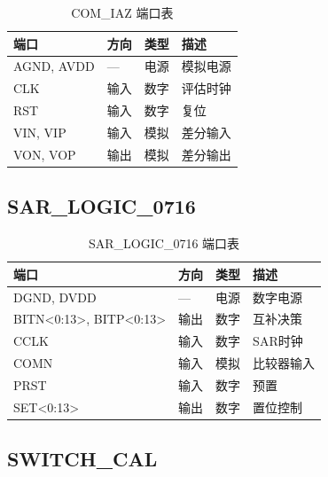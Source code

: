 \documentclass[UTF8,a4paper,11pt]{ctexart}
\begin{document}
\begin{table}[H]
\centering
\caption{COM\_IAZ 端口表}
\label{tab:app-com-ports}
\begin{tabular}{llll}
\toprule
端口 & 方向 & 类型 & 描述 \\
\midrule
AGND, AVDD & --- & 电源 & 模拟电源 \\
CLK        & 输入 & 数字 & 评估时钟 \\
RST        & 输入 & 数字 & 复位 \\
VIN, VIP   & 输入 & 模拟 & 差分输入 \\
VON, VOP   & 输出 & 模拟 & 差分输出 \\
\bottomrule
\end{tabular}
\end{table}

\subsection{SAR\_LOGIC\_0716}

\begin{table}[H]
\centering
\caption{SAR\_LOGIC\_0716 端口表}
\label{tab:app-sar-ports}
\begin{tabular}{llll}
\toprule
端口 & 方向 & 类型 & 描述 \\
\midrule
DGND, DVDD           & --- & 电源 & 数字电源 \\
BITN<0:13>, BITP<0:13> & 输出 & 数字 & 互补决策 \\
CCLK                 & 输入 & 数字 & SAR时钟 \\
COMN                 & 输入 & 模拟 & 比较器输入 \\
PRST                 & 输入 & 数字 & 预置 \\
SET<0:13>            & 输出 & 数字 & 置位控制 \\
\bottomrule
\end{tabular}
\end{table}

\subsection{SWITCH\_CAL}
\end{document}
